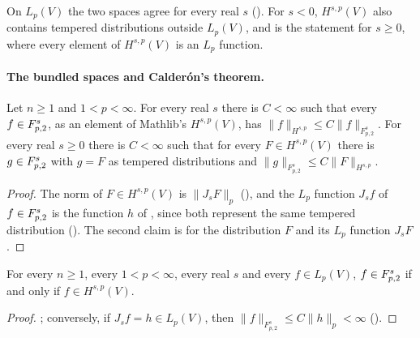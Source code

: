 On $L_p(V)$ the two spaces agree for every real $s$ (). For
$s < 0$, $H^{s,p}(V)$ also contains tempered distributions outside $L_p(V)$, and
 is the statement for $s \geq 0$, where every element of
$H^{s,p}(V)$ is an $L_p$ function.

\paragraph{The bundled spaces and Calder\'on's theorem.}

\begin{corollary}
\label{cor:bessel-bundled}
\leanok
{}
Let $n \geq 1$ and $1 < p < \infty$. For every real $s$ there is $C < \infty$ such that every
$f \in F^{s}_{p,2}$, as an element of Mathlib's $H^{s,p}(V)$, has
$\|f\|_{H^{s,p}} \leq C \|f\|_{F^s_{p,2}}$. For every real $s \geq 0$ there is $C < \infty$ such
that for every $F \in H^{s,p}(V)$ there is $g \in F^{s}_{p,2}$ with $g = F$ as tempered
distributions and $\|g\|_{F^s_{p,2}} \leq C \|F\|_{H^{s,p}}$.
\end{corollary}

\begin{proof}
\leanok
The norm of $F \in H^{s,p}(V)$ is $\|J_s F\|_p$ (), and the
$L_p$ function $J_s f$ of $f \in F^{s}_{p,2}$ is the function $h$ of
, since both represent the same tempered distribution
(). The second claim is
 for the distribution $F$ and its $L_p$ function $J_s F$.
\end{proof}

\begin{corollary}[$\TL{s}{p}{2} = H^{s,p} \cap L_p$]
\label{cor:bessel-triebel-lizorkin}
\leanok
{}
For every $n \geq 1$, every $1 < p < \infty$, every real $s$ and every $f \in L_p(V)$,
$f \in F^{s}_{p,2}$ if and only if $f \in H^{s,p}(V)$.
\end{corollary}

\begin{proof}
\leanok
{}; conversely, if $J_s f = h \in L_p(V)$, then
$\|f\|_{F^s_{p,2}} \leq C \|h\|_p < \infty$ ().
\end{proof}

